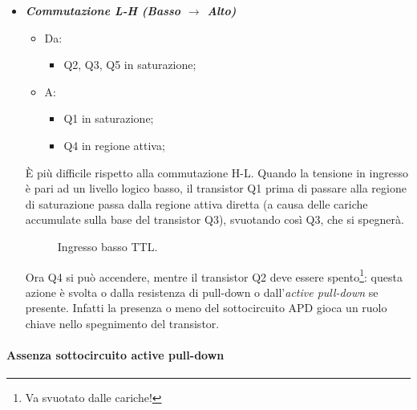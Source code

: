 \documentclass[
]{book}
\providecommand{\tightlist}{%
  \setlength{\itemsep}{0pt}\setlength{\parskip}{0pt}}
\begin{document}
\begin{itemize}
\item
  \textbf{\emph{Commutazione L-H (Basso \(\to\) Alto)}}

  \begin{itemize}
  \tightlist
  \item
    Da:

    \begin{itemize}
    \tightlist
    \item
      Q2, Q3, Q5 in saturazione;
    \end{itemize}
  \item
    A:

    \begin{itemize}
    \tightlist
    \item
      Q1 in saturazione;
    \item
      Q4 in regione attiva;
    \end{itemize}
  \end{itemize}

  È più difficile rispetto alla commutazione H-L. Quando la tensione in
  ingresso è pari ad un livello logico basso, il transistor Q1 prima di
  passare alla regione di saturazione passa dalla regione attiva diretta
  (a causa delle cariche accumulate sulla base del transistor Q3),
  svuotando così Q3, che si spegnerà.

  \begin{figure}[H]
    \centering
    \resizebox{0.25\textwidth}{!}{}
    \caption{Ingresso basso TTL.}
    \end{figure}

  Ora Q4 si può accendere, mentre il transistor Q2 deve essere
  spento\footnote{Va svuotato dalle cariche!}: questa azione è svolta o
  dalla resistenza di pull-down o dall'\emph{active pull-down} se
  presente. Infatti la presenza o meno del sottocircuito APD gioca un
  ruolo chiave nello spegnimento del transistor.
\end{itemize}

\paragraph{Assenza sottocircuito active
pull-down}\label{assenza-sottocircuito-active-pull-down}
\end{document}
